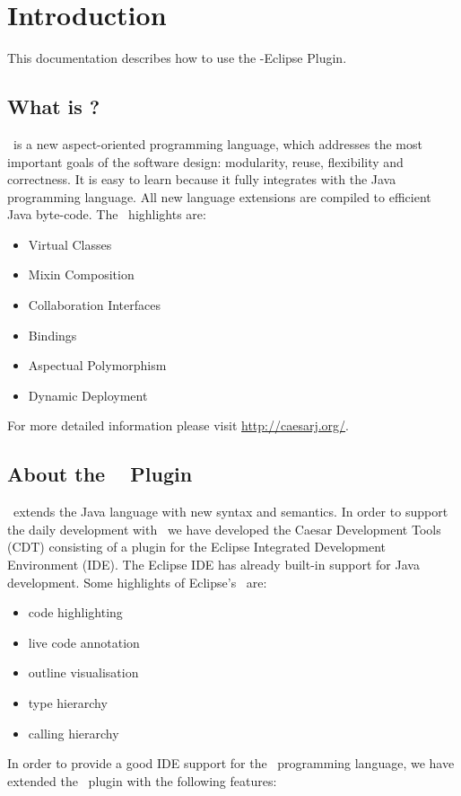 \section{Introduction}
This documentation describes how to use the \caesarj -Eclipse Plugin.


\subsection{What is \caesarj ?}
\caesar ~is a new aspect-oriented programming language, which addresses the most important goals of the software design: modularity, reuse, flexibility and correctness. It is easy to learn because it fully integrates with the Java programming language. All new language extensions are compiled to efficient Java byte-code. The \caesar ~highlights are:
\begin{itemize}
	\item Virtual Classes
	\item Mixin Composition
	\item Collaboration Interfaces	
	\item Bindings
	\item Aspectual Polymorphism	
	\item Dynamic Deployment		
\end{itemize}

For more detailed information please visit \href{http://caesarj.org/}{http://caesarj.org/}.

\subsection{About the \caesarj ~ Plugin}
\caesarj ~extends the Java language with new syntax and semantics. In order to support the daily development with \caesar ~we have developed the Caesar Development Tools (CDT) consisting of a plugin for the Eclipse Integrated Development Environment (IDE). The Eclipse IDE has already built-in support for Java development. Some highlights of Eclipse's \jdt ~are:
\begin{itemize}
	\item code highlighting
	\item live code annotation 
	\item outline visualisation
	\item type hierarchy
	\item calling hierarchy
\end{itemize}

In order to provide a good IDE support for the \caesarj ~programming language, we have extended the \jdt ~plugin with the following features:


